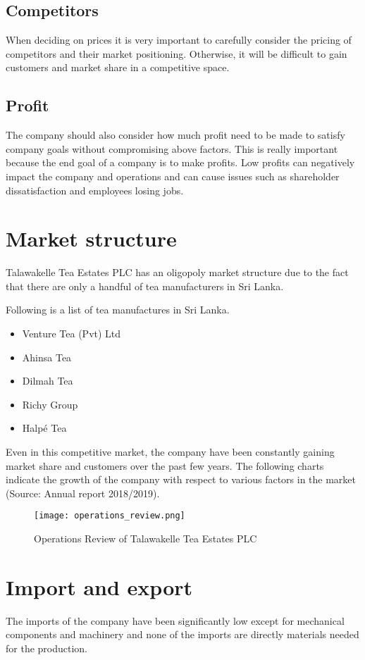 \documentclass[12pt]{report}
\begin{document}
\section{Competitors}
When deciding on prices it is very important to carefully consider the pricing of competitors and their market positioning. Otherwise, it will be difficult to gain customers and market share in a competitive space.

\section{Profit}
The company should also consider how much profit need to be made to satisfy company goals without compromising above factors. This is really important because the end goal of a company is to make profits. Low profits can negatively impact the company and operations and can cause issues such as shareholder dissatisfaction and employees losing jobs.

\chapter{Market structure}
Talawakelle Tea Estates PLC has an oligopoly market structure due to the fact that there are only a handful of tea manufacturers in Sri Lanka.

Following is a list of tea manufactures in Sri Lanka.
\begin{itemize}
	\item {Venture Tea (Pvt) Ltd}
	\item {Ahinsa Tea}
	\item {Dilmah Tea}
	\item {Richy Group}
	\item {Halpé Tea}
\end{itemize}

Even in this competitive market, the company have been constantly gaining market share and customers over the past few years. The following charts indicate the growth of the company with respect to various factors in the market (Source: Annual report 2018/2019).

\begin{figure}[H]
	\centering
	\texttt{[image: operations\_review.png]}
	\caption{Operations Review of Talawakelle Tea Estates PLC}
\end{figure}

\chapter{Import and export}
The imports of the company have been significantly low except for mechanical components and machinery and none of the imports are directly materials needed for the production.
\end{document}
